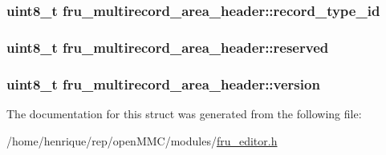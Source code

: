 \hypertarget{structfru__multirecord__area__header_a9c974380dbd24db377f8f6b2cffd6d3e}{
\subsubsection[{record\-\_\-type\-\_\-id}]{\setlength{\rightskip}{0pt plus 5cm}uint8\-\_\-t fru\-\_\-multirecord\-\_\-area\-\_\-header\-::record\-\_\-type\-\_\-id}}\label{structfru__multirecord__area__header_a9c974380dbd24db377f8f6b2cffd6d3e}
\hypertarget{structfru__multirecord__area__header_aaa2a56541a8e9d84e6b96470210e41b5}{
\subsubsection[{reserved}]{\setlength{\rightskip}{0pt plus 5cm}uint8\-\_\-t fru\-\_\-multirecord\-\_\-area\-\_\-header\-::reserved}}\label{structfru__multirecord__area__header_aaa2a56541a8e9d84e6b96470210e41b5}
\hypertarget{structfru__multirecord__area__header_a5ce45c567b923c5b67e11ddc46863c3f}{
\subsubsection[{version}]{\setlength{\rightskip}{0pt plus 5cm}uint8\-\_\-t fru\-\_\-multirecord\-\_\-area\-\_\-header\-::version}}\label{structfru__multirecord__area__header_a5ce45c567b923c5b67e11ddc46863c3f}


The documentation for this struct was generated from the following file\-:\begin{DoxyCompactItemize}
\item 
/home/henrique/rep/open\-M\-M\-C/modules/\hyperlink{fru__editor_8h}{fru\-\_\-editor.\-h}\end{DoxyCompactItemize}
